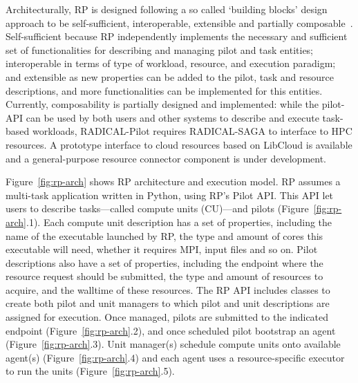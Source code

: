 \documentclass{webofc}
\begin{document}
Architecturally, RP is designed following a so called ‘building blocks’
design approach to be self-sufficient, interoperable, extensible and
partially composable~\cite{turilli2018building}. Self-sufficient because RP
independently implements the necessary and sufficient set of functionalities
for describing and managing pilot and task entities; interoperable in terms
of type of workload, resource, and execution paradigm; and extensible as new
properties can be added to the pilot, task and resource descriptions, and
more functionalities can be implemented for this entities. Currently,
composability is partially designed and implemented: while the pilot-API can
be used by both users and other systems to describe and execute task-based
workloads, RADICAL-Pilot requires RADICAL-SAGA to interface to HPC resources.
A prototype interface to cloud resources based on LibCloud is available and a
general-purpose resource connector component is under development.
	
Figure~\ref{fig:rp-arch} shows RP architecture and execution model. RP
assumes a multi-task application written in Python, using RP's Pilot API.
This API let users to describe tasks---called compute units (CU)---and pilots
(Figure~\ref{fig:rp-arch}.1). Each compute unit description has a set of
properties, including the name of the executable launched by RP, the type and
amount of cores this executable will need, whether it requires MPI, input
files and so on. Pilot descriptions also have a set of properties, including
the endpoint where the resource request should be submitted, the type and
amount of resources to acquire, and the walltime of these resources. The RP
API includes classes to create both pilot and unit managers to which pilot
and unit descriptions are assigned for execution. Once managed, pilots are
submitted to the indicated endpoint (Figure~\ref{fig:rp-arch}.2), and once
scheduled pilot bootstrap an agent (Figure~\ref{fig:rp-arch}.3). Unit
manager(s) schedule compute units onto available agent(s)
(Figure~\ref{fig:rp-arch}.4) and each agent uses a resource-specific executor
to run the units (Figure~\ref{fig:rp-arch}.5).
\end{document}

